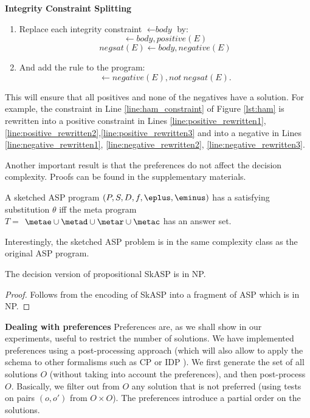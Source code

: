 \vspace{3pt}
\textbf{Integrity Constraint Splitting} 
\begin{enumerate}
  \item Replace each integrity constraint $\leftarrow \textit{body}$ by: 
$$\leftarrow \textit{body}, \textit{positive}(E) $$
$$\textit{negsat}(E) \leftarrow \textit{body}, \textit{negative}(E) $$
\item
And add the rule to the program:
$$ \leftarrow \textit{negative}(E), \textit{not} ~ \textit{negsat}(E).$$ 
\end{enumerate}
This will ensure that all positives and none of the negatives have a solution. For example, the constraint in Line \ref{line:ham_constraint} of Figure \ref{lst:ham} is rewritten into a positive constraint in Lines \ref{line:positive_rewritten1}, \ref{line:positive_rewritten2},\ref{line:positive_rewritten3} and into a negative in Lines \ref{line:negative_rewritten1}, \ref{line:negative_rewritten2}, \ref{line:negative_rewritten3}.


Another important result is that the preferences do not affect the decision complexity. Proofs can be found in the supplementary materials. 
\begin{theorem}
  A sketched ASP program $(P, S, D, f, \eplus,\eminus)$ has a satisfying substitution $\theta$ iff the meta program \\$T=$ \mbox{$\metae\cup\metad \cup \metar \cup \metac$} has an answer set.
  \label{theorem:rewriting}
\end{theorem}
Interestingly, the sketched ASP problem is in the same complexity class as the original ASP program.
\begin{theorem}
  The decision version of propositional SkASP is in NP.
  \label{theorem:complexity_sat}
\end{theorem}
\begin{proof} 
Follows from the encoding of SkASP into a fragment of ASP which is in NP. 
\end{proof}
\textbf{Dealing with preferences} 
Preferences are, as we shall show in our experiments, useful to restrict the number of solutions.
We have implemented preferences using a post-processing approach (which will also allow to apply the schema to other formalisms such as CP or IDP \parencite{idp}).
We first generate the set of all solutions $O$ (without taking into account the preferences), and then post-process $O$. Basically, we filter out
from $O$ any solution that is not preferred (using tests on pairs $(o,o')$ from $O \times O$). %
The preferences introduce a partial order on the solutions. 

